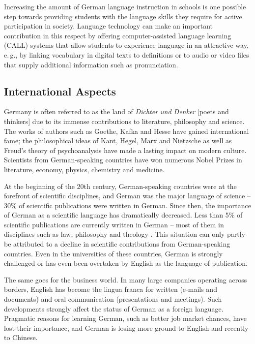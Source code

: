 \documentclass[]{../../metanetpaper}
\begin{document}
\begin{multicols}{2}

Increasing the amount of German language instruction in schools is one possible step towards providing students with the language skills they require for active participation in society. Language technology can make an important contribution in this respect by offering computer-assisted language learning (CALL) systems that allow students to experience language in an attractive way, e.\,g., by linking vocabulary in digital texts to definitions or to audio or video files that supply additional information such as pronunciation.

\subsection{International Aspects}

Germany is often referred to as the land of \textit{Dichter und Denker} [poets and thinkers] due to its immense contributions to literature, philosophy and science. The works of authors such as Goethe, Kafka and Hesse have gained international fame; the philosophical ideas of Kant, Hegel, Marx and Nietzsche as well as Freud's theory of psychoanalysis have made a lasting impact on modern culture. Scientists from German-speaking countries have won numerous Nobel Prizes in literature, economy, physics, chemistry and medicine.

At the beginning of the 20th century, German-speaking countries were at the forefront of scientific disciplines, and German was the major language of science -- 30\% of scientific publications were written in German. Since then, the importance of German as a scientific language has dramatically decreased. Less than 5\% of scientific publications are currently written in German -- most of them in disciplines such as law, philosophy and theology \cite{joy1}. This situation can only partly be attributed to a decline in scientific contributions from German-speaking countries. Even in the universities of these countries, German is strongly challenged or has even been overtaken by English as the language of publication.


The same goes for the business world. In many large companies operating across borders, English has become the lingua franca for written (e-mails and documents) and oral communication (presentations and meetings). Such developments strongly affect the status of German as a foreign language. Pragmatic reasons for learning German, such as better job market chances, have lost their importance, and German is losing more ground to English and recently to Chinese. 


\end{multicols}
\end{document}
